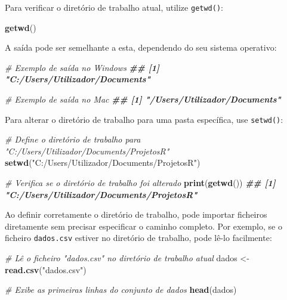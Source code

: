 \documentclass[
]{book}
\newenvironment{Shaded}{\begin{snugshade}}{\end{snugshade}}
\newcommand{\CommentTok}[1]{\textcolor[rgb]{0.56,0.35,0.01}{\textit{#1}}}
\newcommand{\DocumentationTok}[1]{\textcolor[rgb]{0.56,0.35,0.01}{\textbf{\textit{#1}}}}
\newcommand{\FunctionTok}[1]{\textcolor[rgb]{0.13,0.29,0.53}{\textbf{#1}}}
\newcommand{\NormalTok}[1]{#1}
\newcommand{\OtherTok}[1]{\textcolor[rgb]{0.56,0.35,0.01}{#1}}
\newcommand{\StringTok}[1]{\textcolor[rgb]{0.31,0.60,0.02}{#1}}
\begin{document}
Para verificar o diretório de trabalho atual, utilize \texttt{getwd()}:

\begin{Shaded}
\begin{Highlighting}[]
\FunctionTok{getwd}\NormalTok{()}
\end{Highlighting}
\end{Shaded}

A saída pode ser semelhante a esta, dependendo do seu sistema operativo:

\begin{Shaded}
\begin{Highlighting}[]
\CommentTok{\# Exemplo de saída no Windows}
\DocumentationTok{\#\# [1] "C:/Users/Utilizador/Documents"}

\CommentTok{\# Exemplo de saída no Mac}
\DocumentationTok{\#\# [1] "/Users/Utilizador/Documents"}
\end{Highlighting}
\end{Shaded}

Para alterar o diretório de trabalho para uma pasta específica, use
\texttt{setwd()}:

\begin{Shaded}
\begin{Highlighting}[]
\CommentTok{\# Define o diretório de trabalho para "C:/Users/Utilizador/Documents/ProjetosR"}
\FunctionTok{setwd}\NormalTok{(}\StringTok{"C:/Users/Utilizador/Documents/ProjetosR"}\NormalTok{)}

\CommentTok{\# Verifica se o diretório de trabalho foi alterado}
\FunctionTok{print}\NormalTok{(}\FunctionTok{getwd}\NormalTok{())}
\DocumentationTok{\#\# [1] "C:/Users/Utilizador/Documents/ProjetosR"}
\end{Highlighting}
\end{Shaded}

Ao definir corretamente o diretório de trabalho, pode importar ficheiros
diretamente sem precisar especificar o caminho completo. Por exemplo, se
o ficheiro \texttt{dados.csv} estiver no diretório de trabalho, pode lê-lo
facilmente:

\begin{Shaded}
\begin{Highlighting}[]
\CommentTok{\# Lê o ficheiro "dados.csv" no diretório de trabalho atual}
\NormalTok{dados }\OtherTok{\textless{}{-}} \FunctionTok{read.csv}\NormalTok{(}\StringTok{"dados.csv"}\NormalTok{)}

\CommentTok{\# Exibe as primeiras linhas do conjunto de dados}
\FunctionTok{head}\NormalTok{(dados)}
\end{Highlighting}
\end{Shaded}
\end{document}
